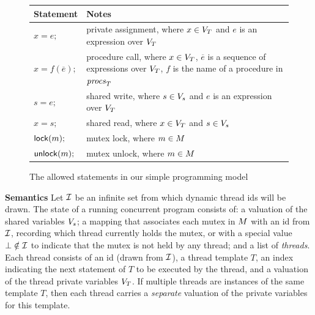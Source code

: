 \begin{figure}
\footnotesize
\center
\setlength{\tabcolsep}{0.45em}
\begin{tabular}{lp{6.8cm}}
\textbf{Statement} & \textbf{Notes} \\
\toprule

$x = e;$ & private assignment, where $x \in V_{T}$ and $e$ is an expression over $V_{T}$ \\
\midrule

$x = f(\overline{e});$ & procedure call, where $x \in V_{T}$, $\overline{e}$ is a sequence of expressions over $V_{T}$, $f$ is the name of a procedure in $\mathit{procs}_{T}$ \\
\midrule

$s = e;$ & shared write, where $s \in V_s$ and $e$ is an expression over $V_{T}$ \\
\midrule

$x = s;$ & shared read,  where $x \in V_{T}$ and $s \in V_s$ \\
\midrule

$\mathsf{lock}(m);$   & mutex lock, where $m \in M$ \\
\midrule

$\mathsf{unlock}(m);$ & mutex unlock, where $m \in M$\\
\bottomrule
\end{tabular}
\caption{The allowed statements in our simple programming model}
\label{fig:statements}
\end{figure}

\noindent\textbf{Semantics }
%
Let $\mathcal{I}$ be an infinite set from which dynamic thread ids will be drawn.  The state of a running concurrent program consists of: a valuation of the shared variables $V_s$; a mapping that associates each mutex in $M$ with an id from $\mathcal{I}$, recording which thread currently holds the mutex, or with a special value $\bot \notin \mathcal{I}$ to indicate that the mutex is not held by any thread; and a list of \emph{threads}.  Each thread consists of an id (drawn from $\mathcal{I}$), a thread template $T$, an index indicating the next statement of $T$ to be executed by the thread, and a valuation of the thread private variables $V_{T}$.  If multiple threads are instances of the same template $T$, then each thread carries a \emph{separate} valuation of the private variables for this template.

